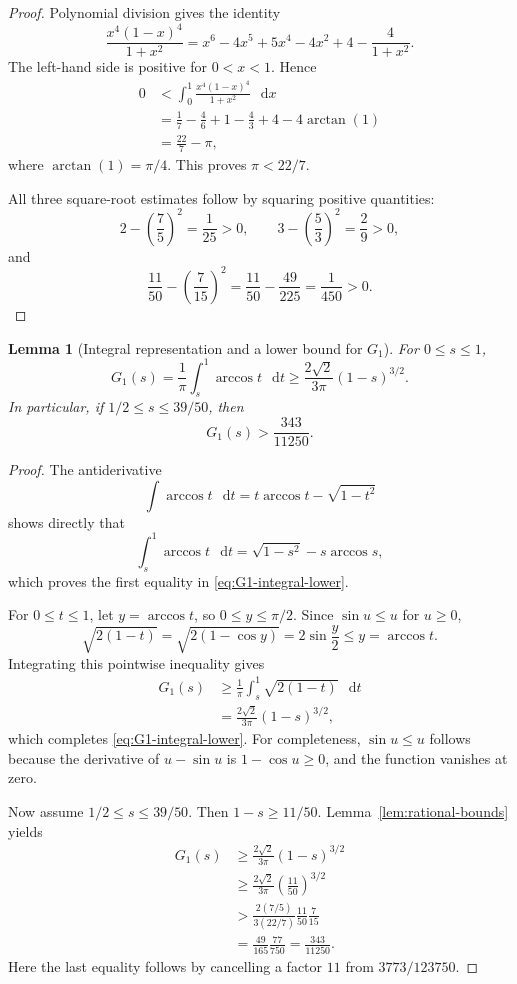 \documentclass[11pt]{article}
\newtheorem{lemma}{Lemma}
\newcommand{\dd}{\mathop{}\!\mathrm{d}}
\begin{document}
\begin{proof}
Polynomial division gives the identity
\[
 \frac{x^4(1-x)^4}{1+x^2}
 =x^6-4x^5+5x^4-4x^2+4-\frac4{1+x^2}.
\]
The left-hand side is positive for \(0<x<1\). Hence
\begin{align*}
 0
 &<\int_0^1\frac{x^4(1-x)^4}{1+x^2}\,\dd x\\
 &=\frac17-\frac{4}{6}+1-\frac43+4
   -4\arctan(1)\\
 &=\frac{22}{7}-\pi,
\end{align*}
where \(\arctan(1)=\pi/4\). This proves \(\pi<22/7\).

All three square-root estimates follow by squaring positive quantities:
\[
 2-\left(\frac75\right)^2=\frac1{25}>0,
 \qquad
 3-\left(\frac53\right)^2=\frac29>0,
\]
and
\[
 \frac{11}{50}-\left(\frac7{15}\right)^2
 =\frac{11}{50}-\frac{49}{225}
 =\frac1{450}>0.
\]
\end{proof}

\begin{lemma}[Integral representation and a lower bound for \(G_1\)]
\label{lem:G1-lower}
For \(0\leq s\leq1\),
\begin{equation}
 G_1(s)=\frac1\pi\int_s^1\arccos t\,\dd t
 \geq\frac{2\sqrt2}{3\pi}(1-s)^{3/2}.
 \label{eq:G1-integral-lower}
\end{equation}
In particular, if \(1/2\leq s\leq39/50\), then
\begin{equation}
 G_1(s)>\frac{343}{11250}.
 \label{eq:G1-rational-lower}
\end{equation}
\end{lemma}

\begin{proof}
The antiderivative
\[
 \int\arccos t\,\dd t=t\arccos t-\sqrt{1-t^2}
\]
shows directly that
\[
 \int_s^1\arccos t\,\dd t
 =\sqrt{1-s^2}-s\arccos s,
\]
which proves the first equality in \eqref{eq:G1-integral-lower}.

For \(0\leq t\leq1\), let \(y=\arccos t\), so
\(0\leq y\leq\pi/2\). Since \(\sin u\leq u\) for \(u\geq0\),
\[
 \sqrt{2(1-t)}
 =\sqrt{2(1-\cos y)}
 =2\sin\frac y2
 \leq y=\arccos t.
\]
Integrating this pointwise inequality gives
\begin{align*}
 G_1(s)
 &\geq\frac1\pi\int_s^1\sqrt{2(1-t)}\,\dd t\\
 &=\frac{2\sqrt2}{3\pi}(1-s)^{3/2},
\end{align*}
which completes \eqref{eq:G1-integral-lower}. For completeness,
\(\sin u\leq u\) follows because the derivative of
\(u-\sin u\) is \(1-\cos u\geq0\), and the function vanishes at zero.

Now assume \(1/2\leq s\leq39/50\). Then
\(1-s\geq11/50\). Lemma~\ref{lem:rational-bounds} yields
\begin{align*}
 G_1(s)
 &\geq\frac{2\sqrt2}{3\pi}(1-s)^{3/2}\\
 &\geq\frac{2\sqrt2}{3\pi}
       \left(\frac{11}{50}\right)^{3/2}\\
 &>\frac{2(7/5)}{3(22/7)}
       \frac{11}{50}\frac7{15}\\
 &=\frac{49}{165}\frac{77}{750}
  =\frac{343}{11250}.
\end{align*}
Here the last equality follows by cancelling a factor \(11\) from
\(3773/123750\).
\end{proof}
\end{document}
